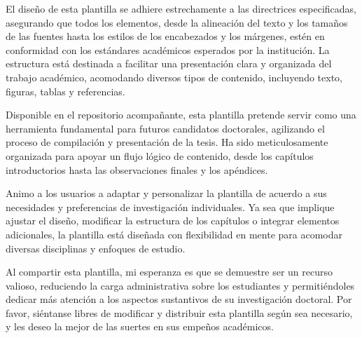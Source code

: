 El diseño de esta plantilla se adhiere estrechamente a las directrices especificadas, asegurando que todos los elementos, desde la alineación del texto y los tamaños de las fuentes hasta los estilos de los encabezados y los márgenes, estén en conformidad con los estándares académicos esperados por la institución. La estructura está destinada a facilitar una presentación clara y organizada del trabajo académico, acomodando diversos tipos de contenido, incluyendo texto, figuras, tablas y referencias.

Disponible en el repositorio acompañante, esta plantilla pretende servir como una herramienta fundamental para futuros candidatos doctorales, agilizando el proceso de compilación y presentación de la tesis. Ha sido meticulosamente organizada para apoyar un flujo lógico de contenido, desde los capítulos introductorios hasta las observaciones finales y los apéndices.

Animo a los usuarios a adaptar y personalizar la plantilla de acuerdo a sus necesidades y preferencias de investigación individuales. Ya sea que implique ajustar el diseño, modificar la estructura de los capítulos o integrar elementos adicionales, la plantilla está diseñada con flexibilidad en mente para acomodar diversas disciplinas y enfoques de estudio.

Al compartir esta plantilla, mi esperanza es que se demuestre ser un recurso valioso, reduciendo la carga administrativa sobre los estudiantes y permitiéndoles dedicar más atención a los aspectos sustantivos de su investigación doctoral. Por favor, siéntanse libres de modificar y distribuir esta plantilla según sea necesario, y les deseo la mejor de las suertes en sus empeños académicos.

